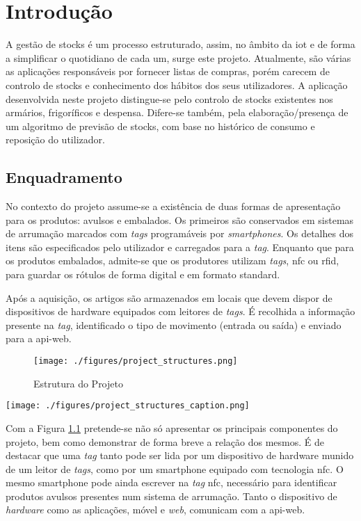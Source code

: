 %
%
\chapter{Introdução} \label{cap1}

A gestão de stocks é um processo estruturado, assim, no âmbito da \acrfull{iot} e de forma a simplificar o quotidiano de cada um, surge este projeto. Atualmente, são várias as aplicações responsáveis por fornecer listas de compras, porém carecem de controlo de stocks e conhecimento dos hábitos dos seus utilizadores. A aplicação desenvolvida neste projeto distingue-se pelo controlo de stocks existentes nos armários, frigoríficos e despensa. Difere-se também, pela elaboração/presença de um algoritmo de previsão de stocks, com base no histórico de consumo e reposição do utilizador.

%
%
\section{Enquadramento} \label{sec11}

No contexto do projeto assume-se a existência de duas formas de apresentação para os produtos: avulsos e embalados. Os primeiros são conservados em sistemas de arrumação marcados com \textit{tags} programáveis por \textit{smartphones}. Os detalhes dos itens são especificados pelo utilizador e carregados para a \textit{tag}. Enquanto que para os produtos embalados, admite-se que os produtores utilizam \textit{tags}, \acrfull{nfc} ou \acrfull{rfid}, para guardar os rótulos de forma digital e em formato standard.

Após a aquisição, os artigos são armazenados em locais que devem dispor de dispositivos de hardware equipados com leitores de \textit{tags}. É recolhida a informação presente na \textit{tag}, identificado o tipo de movimento (entrada ou saída) e enviado para a \gls{api-web}. 

\begin{figure}[H]
	\centering
	\texttt{[image: ./figures/project\_structures.png]}
	\caption{Estrutura do Projeto}
	\label{project-structure}
\end{figure}

\begin{center}
	\texttt{[image: ./figures/project\_structures\_caption.png]}
\end{center}



Com a Figura \ref{project-structure} pretende-se não só apresentar os principais componentes do projeto, bem como demonstrar de forma breve a relação dos mesmos. É de destacar que uma \textit{tag} tanto pode ser lida por um dispositivo de hardware munido de um leitor de \textit{tags}, como por um smartphone equipado com tecnologia \acrshort{nfc}. O mesmo smartphone pode ainda escrever na \textit{tag} \acrshort{nfc}, necessário para identificar produtos avulsos presentes num sistema de arrumação. Tanto o dispositivo de \textit{hardware} como as aplicações, móvel e \textit{web}, comunicam com a \gls{api-web}.

